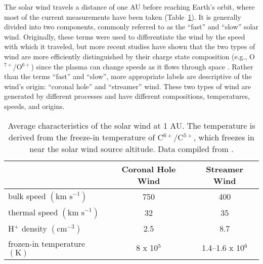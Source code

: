 The solar wind travels a distance of one \ac{AU} before reaching Earth's orbit, where most of the current measurements have been taken (Table~\ref{tab:solar wind}). It is generally divided into two components, commonly referred to as the ``fast'' and ``slow'' solar wind. Originally, these terms were used to differentiate the wind by the speed with which it traveled, but more recent studies have shown that the two types of wind are more efficiently distinguished by their charge state composition (e.g., O$^{7+}$/O$^{6+}$) since the plasma can change speeds as it flows through space \citep{geiss95b, gloeckler03a}. Rather than the terms ``fast'' and ``slow'', more appropriate labels are descriptive of the wind's origin: ``coronal hole'' and ``streamer'' wind. These two types of wind are generated by different processes and have different compositions, temperatures, speeds, and origins.
\begin{table}[htbp]
	\centering
		\begin{tabular}{l|c|c}
		                                                               & Coronal Hole Wind & Streamer Wind     \\ \hline
      bulk speed \footnotesize{$\left(\text{km s}^{-1}\right)$}    & 750               & 400               \\ \hline
      thermal speed \footnotesize{$\left(\text{km s}^{-1}\right)$} & 32                & 35                \\ \hline
      H$^+$ density \footnotesize{$\left(\text{cm}^{-3}\right)$}   & 2.5               & 8.7               \\ \hline
      frozen-in temperature \footnotesize{$\left(\text{K}\right)$} & 8 x 10$^5$        & 1.4--1.6 x 10$^6$ \\ \hline

		\end{tabular}
	\caption[Average characteristics of the solar wind at 1 AU.]{Average characteristics of the solar wind at 1 AU. The temperature is derived from the freeze-in temperature of C$^{6+}$/C$^{5+}$, which freezes in near the solar wind source altitude. Data compiled from \citet{vonsteiger95, gloeckler98a, ipavich98, mccomas00, feldman05}.}
	\label{tab:solar wind}
\end{table}

